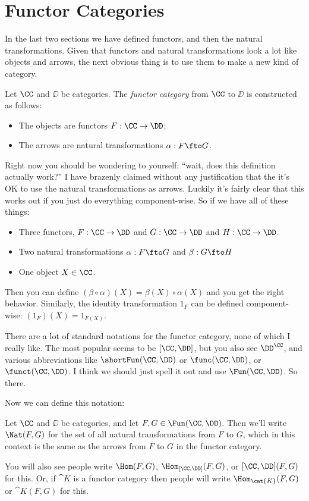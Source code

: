 \section{Functor Categories}

In the last two sections we have defined functors, and then the natural
transformations. Given that functors and natural transformations look a lot like objects and arrows,
the next obvious thing is to use them to make a new kind of category.

\goodbreak
\begin{defn}
 Let $\CC$ and $\DD$ be categories. The \emph{functor category} from $\CC$ to $\DD$ is
 constructed as follows:
 \begin{itemize}
  \item The objects are functors $F: \CC \to \DD$;
  \item The arrows are natural transformations $\alpha:F\fto G$.
 \end{itemize}
\end{defn}
\noindent
Right now you should be wondering to yourself: ``wait, does this definition actually
work?'' I have brazenly claimed without any justification that the it's OK to use the
natural transformations as arrows. Luckily it's fairly clear that this works out if you
just do everything component-wise. So if we have all of these things: 
\begin{itemize}
\item Three functors, $F: \CC \to \DD$ and $G: \CC \to \DD$ and $H:\CC \to \DD$.

\item Two natural transformations $\alpha: F \fto G$ and $\beta: G \fto H$

\item One object $X \in \CC$.
\end{itemize}
\noindent
Then you can define $(\beta \circ \alpha)(X) = \beta(X) \circ \alpha(X)$ and you get the
right behavior. Similarly, the identity transformation $1_F$ can be defined
component-wise: $(1_F)(X) = 1_{F(X)}$.

There are a lot of standard notations for the functor category, none of which I really
like. The most popular seems to be $[\CC, \DD]$, but you also see $\DD^{\CC}$, and various
abbreviations like $\shortFun(\CC,\DD)$ or $\func(\CC,\DD)$,
or $\funct(\CC,\DD)$. I think we should just spell it out and use
$\Fun(\CC,\DD)$. So there.

Now we can define this notation:

\begin{defn}
Let $\CC$ and $\DD$ be categories, and let $F, G \in \Fun(\CC, \DD)$. Then we'll write
$\Nat(F, G)$ for the set of all natural transformations from $F$ to $G$, which in this
context is the same as the arrows from $F$ to $G$ in the functor category.
\end{defn}
\noindent
You will also see people write $\Hom(F, G)$, $\Hom_{[\CC,\DD]}(F,G)$, or 
$[\CC,\DD](F,G)$ for this. Or, if $\cat{K}$ is a functor category then 
people will write $\Hom_{\cat{K}}(F,G)$ or
$\cat{K}(F,G)$ for this.

